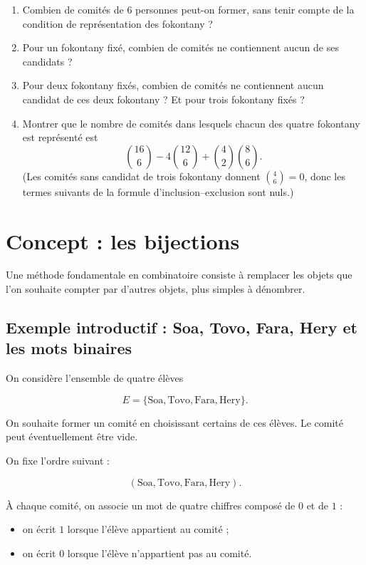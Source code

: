 \begin{enumerate}
    \item Combien de comités de \(6\) personnes peut-on former, sans tenir compte de la condition de
    représentation des fokontany ?

    \item Pour un fokontany fixé, combien de comités ne contiennent aucun de ses
    candidats ?

    \item Pour deux fokontany fixés, combien de comités ne contiennent aucun
    candidat de ces deux fokontany ? Et pour trois fokontany fixés ?

    \item Montrer que le nombre de comités dans lesquels chacun des quatre
    fokontany est représenté est
    \[
    \binom{16}{6}
    -
    4\binom{12}{6}
    +
    \binom{4}{2}\binom{8}{6}.
    \]
    (Les comités sans candidat de trois fokontany donnent \(\binom{4}{6}=0\), donc les termes suivants de
    la formule d’inclusion--exclusion sont nuls.)

\end{enumerate}

\section{Concept : les bijections}

Une méthode fondamentale en combinatoire consiste à remplacer les objets
que l'on souhaite compter par d'autres objets, plus simples à dénombrer.

\subsection{Exemple introductif : Soa, Tovo, Fara, Hery et les mots binaires}

On considère l'ensemble de quatre élèves

\[
E=\{\text{Soa},\text{Tovo},\text{Fara},\text{Hery}\}.
\]

On souhaite former un comité en choisissant certains de ces élèves.
Le comité peut éventuellement être vide.

On fixe l'ordre suivant :

\[
(\text{Soa},\text{Tovo},\text{Fara},\text{Hery}).
\]

À chaque comité, on associe un mot de quatre chiffres composé de \(0\) et de
\(1\) :

\begin{itemize}
    \item on écrit \(1\) lorsque l'élève appartient au comité ;
    \item on écrit \(0\) lorsque l'élève n'appartient pas au comité.
\end{itemize}

